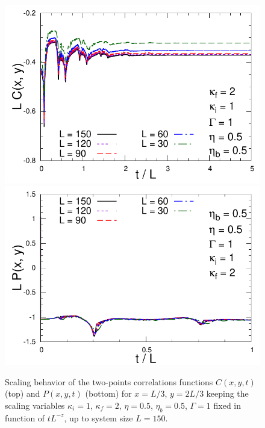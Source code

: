 \documentclass[pra,twocolumn,preprintnumbers,amsmath,amssymb,nofootinbib,floatfix,longbibliography]{revtex4}
\begin{document}
\begin{figure}[!htb]
  \includegraphics[width=0.95\columnwidth]
    {figs/LCk1q2e050t050S1000.pdf}
  \includegraphics[width=0.95\columnwidth]
    {figs/LPk1q2e050t050S1000.pdf}
  \caption{Scaling behavior of the two-points
    correlations functions $C(x,y,t)$ (top) and $P(x,y,t)$
    (bottom) for $x=L/3$, $y=2L/3$  keeping the scaling
    variables $\kappa_i=1$, $\kappa_f=2$, $\eta =0.5$,
    $\eta_b=0.5$, $\Gamma = 1$ fixed in function of
    $tL^{-z}$, up to system size $L=150$.}
  \label{k1q2e050t050S1000}
\end{figure}
\end{document}

